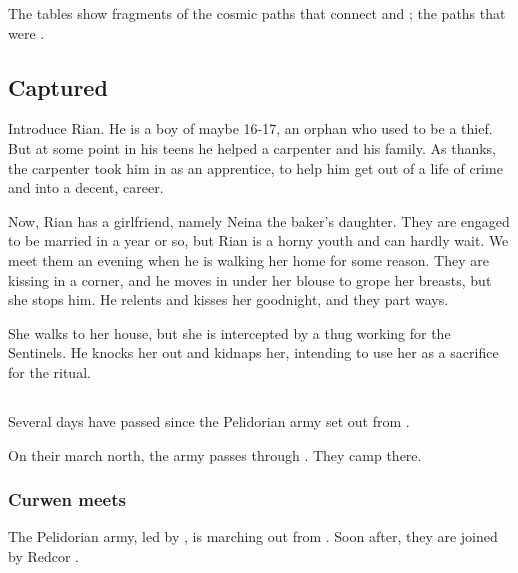 The tables show fragments of the cosmic paths that connect \Miith{} and \Machai; the paths that were . 









\subsection{Captured}
Introduce Rian. He is a \Malcurian boy of maybe 16-17, an orphan who used to be a thief. But at some point in his teens he helped a carpenter and his family. As thanks, the carpenter took him in as an apprentice, to help him get out of a life of crime and into a decent, \honourable career. 

Now, Rian has a girlfriend, namely Neina the baker's daughter. They are engaged to be married in a year or so, but Rian is a horny youth and can hardly wait. We meet them an evening when he is walking her home for some reason. They are kissing in a corner, and he moves in under her blouse to grope her breasts, but she stops him. He relents and kisses her goodnight, and they part ways. 

She walks to her house, but she is intercepted by a thug working for the Sentinels. He knocks her out and kidnaps her, intending to use her as a sacrifice for the \Nithdornazsh{} ritual. 







\subsection{\Forclin}
Several days have passed since the Pelidorian army set out from \Malcur. 

On their march north, the army passes through \Forclin. They camp there. 





\subsubsection{Curwen meets \Esmerel}
The Pelidorian army, led by , is marching out from \Malcur. Soon after, they are joined by Redcor \Matron{} \Esmerel. 

